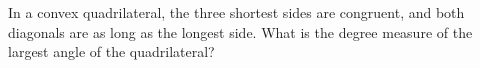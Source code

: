 In a convex quadrilateral, the three shortest sides are congruent, and both diagonals are as long as the longest side. What is the degree measure of the largest angle of the quadrilateral?
